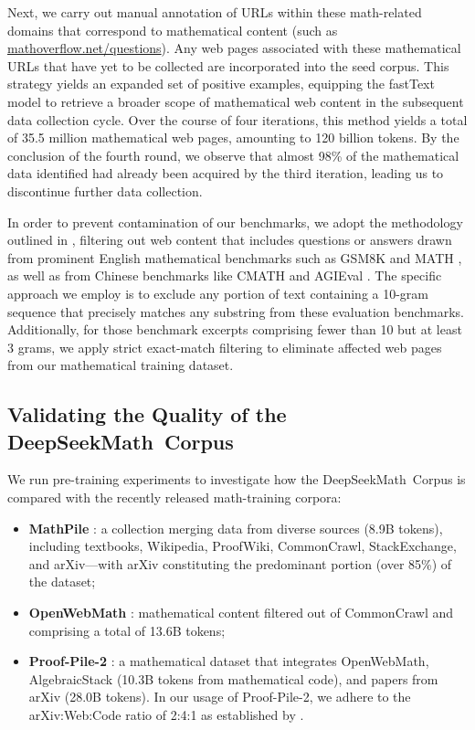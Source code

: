 \begin{itemize}[topsep=0pt]
Next, we carry out manual annotation of URLs within these math-related domains that correspond to mathematical content (such as \url{mathoverflow.net/questions}). Any web pages associated with these mathematical URLs that have yet to be collected are incorporated into the seed corpus. This strategy yields an expanded set of positive examples, equipping the fastText model to retrieve a broader scope of mathematical web content in the subsequent data collection cycle. Over the course of four iterations, this method yields a total of 35.5 million mathematical web pages, amounting to 120 billion tokens. By the conclusion of the fourth round, we observe that almost 98\% of the mathematical data identified had already been acquired by the third iteration, leading us to discontinue further data collection.

In order to prevent contamination of our benchmarks, we adopt the methodology outlined in \cite{deepseek-coder}, filtering out web content that includes questions or answers drawn from prominent English mathematical benchmarks such as GSM8K \citep{gsm8k} and MATH \citep{MATH}, as well as from Chinese benchmarks like CMATH \citep{wei2023cmath} and AGIEval \citep{agieval}. The specific approach we employ is to exclude any portion of text containing a 10-gram sequence that precisely matches any substring from these evaluation benchmarks. Additionally, for those benchmark excerpts comprising fewer than 10 but at least 3 grams, we apply strict exact-match filtering to eliminate affected web pages from our mathematical training dataset.

\subsection{Validating the Quality of the DeepSeekMath~Corpus}

We run pre-training experiments to investigate how the DeepSeekMath~Corpus is compared with the recently released math-training corpora:

\begin{itemize}[topsep=0pt]
    \item \textbf{MathPile} \citep{mathpile}: a collection merging data from diverse sources (8.9B tokens), including textbooks, Wikipedia, ProofWiki, CommonCrawl, StackExchange, and arXiv—with arXiv constituting the predominant portion (over 85\%) of the dataset;
    \item \textbf{OpenWebMath} \citep{openwebmath}: mathematical content filtered out of CommonCrawl and comprising a total of 13.6B tokens;
    \item \textbf{Proof-Pile-2} \citep{llemma}: a mathematical dataset that integrates OpenWebMath, AlgebraicStack (10.3B tokens from mathematical code), and papers from arXiv (28.0B tokens). In our usage of Proof-Pile-2, we adhere to the arXiv:Web:Code ratio of 2:4:1 as established by \cite{llemma}.
\end{itemize}


\end{itemize}
